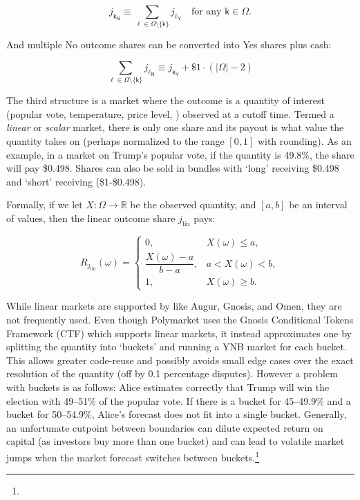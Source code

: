 \[
j_{\mathsf{k_N}} \equiv \sum_{\ell \in \Omega\setminus\{\mathsf{k}\}} j_{\mathsf{\ell_Y}} \quad\text{for any }\mathsf{k}\in\Omega.
\]

And multiple No outcome shares can be converted into Yes shares plus cash:

\[
\sum_{\ell \in \Omega\setminus\{\mathsf{k}\}} j_{\mathsf{\ell_N}}
\equiv
j_{\mathsf{k_Y}} + \$1\cdot(|\Omega|-2)
\]


The third structure is a market where the outcome is a quantity of interest (\eg popular vote, temperature, price level, \etc) observed at a cutoff time. Termed a \textit{linear} or \textit{scalar} market, there is only one share and its payout is what value the quantity takes on (perhaps normalized to the range $[0,1]$ with rounding). As an example, in a market on Trump's popular vote, if the quantity is 49.8\%, the share will pay \$0.498. Shares can also be sold in bundles with `long' receiving \$0.498 and `short' receiving (\$1-\$0.498).

Formally, if we let $X:\Omega\to\mathbb{R}$ be the observed quantity, and $[a,b]$ be an interval of values, then the linear outcome share $j_{\mathrm{lin}}$ pays:

\[
R_{j_{\mathrm{lin}}}(\omega)=
\begin{cases}
0, & X(\omega)\le a,\\[3pt]
\dfrac{X(\omega)-a}{\,b-a\,}, & a< X(\omega) < b,\\[6pt]
1, & X(\omega)\ge b.
\end{cases}
\]

While linear markets are supported by \depms like Augur, Gnosis, and Omen, they are not frequently used. Even though Polymarket uses the Gnosis Conditional Tokens Framework (CTF) which supports linear markets, it instead approximates one by splitting the quantity into `buckets' and running a YNB market for each bucket. This allows greater code-reuse and possibly avoids small edge cases over the exact resolution of the quantity (\eg off by 0.1 percentage disputes). However a problem with buckets is as follows: Alice estimates correctly that Trump will win the election with 49--51\% of the popular vote. If there is a bucket for 45--49.9\% and a bucket for 50--54.9\%, Alice's forecast does not fit into a single bucket. Generally, an unfortunate cutpoint between boundaries can dilute expected return on capital (as investors buy more than one bucket) and can lead to volatile market jumps when the market forecast switches between buckets.\footnote{} 

